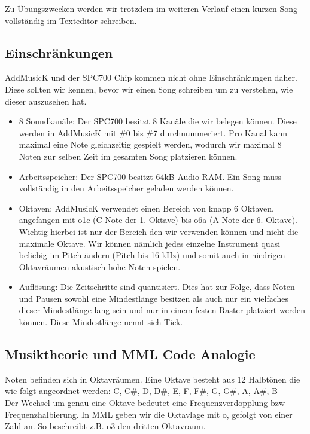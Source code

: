 Zu Übungszwecken werden wir trotzdem im weiteren Verlauf einen kurzen Song vollständig im Texteditor schreiben.


\subsection*{Einschränkungen}
AddMusicK und der SPC700 Chip kommen nicht ohne Einschränkungen daher. Diese sollten wir kennen, bevor wir einen Song schreiben um zu verstehen, wie dieser auszusehen hat.

\begin{itemize}
	\item 8 Soundkanäle: Der SPC700 besitzt 8 Kanäle die wir belegen können. Diese werden in AddMusicK mit \#0 bis \#7 durchnummeriert. Pro Kanal kann maximal eine Note gleichzeitig gespielt werden, wodurch wir maximal 8 Noten zur selben Zeit im gesamten Song platzieren können.
	\item Arbeitsspeicher: Der SPC700 besitzt 64kB Audio RAM. Ein Song muss vollständig in den Arbeitsspeicher geladen werden können.
	\item Oktaven: AddMusicK verwendet einen Bereich von knapp 6 Oktaven, angefangen mit o1c (C Note der 1. Oktave) bis o6a (A Note der 6. Oktave). Wichtig hierbei ist nur der Bereich den wir verwenden können und nicht die maximale Oktave. Wir können nämlich jedes einzelne Instrument quasi beliebig im Pitch ändern (Pitch bis 16 kHz) und somit auch in niedrigen Oktavräumen akustisch hohe Noten spielen.
	\item Auflösung: Die Zeitschritte sind quantisiert. Dies hat zur Folge, dass Noten und Pausen sowohl eine Mindestlänge besitzen als auch nur ein vielfaches dieser Mindestlänge lang sein und nur in einem festen Raster platziert werden können. Diese Mindestlänge nennt sich Tick.
\end{itemize}

\subsection{Musiktheorie und MML Code Analogie}

Noten befinden sich in Oktavräumen. Eine Oktave besteht aus 12 Halbtönen die wie folgt angeordnet werden:
C, C\#, D, D\#, E, F, F\#, G, G\#, A, A\#, B \\
Der Wechsel um genau eine Oktave bedeutet eine Frequenzverdopplung bzw Frequenzhalbierung.
In MML geben wir die Oktavlage mit o, gefolgt von einer Zahl an.
So beschreibt z.B. o3 den dritten Oktavraum. \\

